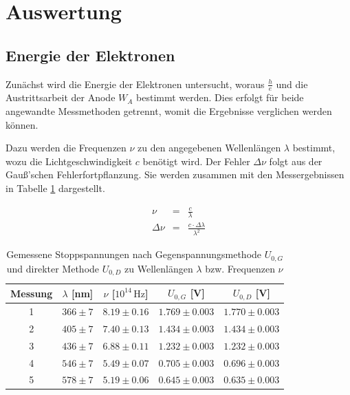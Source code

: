 \documentclass[12pt,a4paper]{scrartcl}
\numberwithin{equation}{section} %
\begin{document}
\clearpage
\hypertarget{auswertung}{\section{Auswertung}\label{auswertung}}
\subsection{Energie der Elektronen}
\label{auswertung:h/e}
Zunächst wird die Energie der Elektronen untersucht, woraus $\frac{h}{e}$ und die Austrittsarbeit der Anode $W_A$ bestimmt werden. Dies erfolgt für beide angewandte Messmethoden getrennt, womit die Ergebnisse verglichen werden können.

Dazu werden die Frequenzen $\nu$ zu den angegebenen Wellenlängen $\lambda$ bestimmt, wozu die Lichtgeschwindigkeit $c$ benötigt wird. Der Fehler $\Delta \nu$ folgt aus der Gauß'schen Fehlerfortpflanzung. Sie werden zusammen mit den Messergebnissen in Tabelle \ref{table:Messwerte Energie} dargestellt.

\begin{eqnarray}
	\nu &=& \frac{c}{\lambda} \label{eq:frequenzWellenlänge} \\
	\Delta \nu &=& \frac{c \cdot \Delta \lambda}{\lambda^2}
\end{eqnarray}

\begin{table}[h!]
	\centering
	\begin{tabular}{c|c|c|c|c}
		Messung & $\lambda$ [nm] & $\nu$ [$10^{14} \mathrm{\, Hz}$] & $U_{0,G}$ [V] & $U_{0,D}$ [V] \\
		\hline
		1 & $366 \pm 7$ & $8.19 \pm 0.16$ & $1.769 \pm 0.003$ & $1.770 \pm 0.003$ \\
		2 & $405 \pm 7$ & $7.40 \pm 0.13$ & $1.434 \pm 0.003$ & $1.434 \pm 0.003$ \\
		3 & $436 \pm 7$ & $6.88 \pm 0.11$ & $1.232 \pm 0.003$ & $1.232 \pm 0.003$ \\
		4 & $546 \pm 7$ & $5.49 \pm 0.07$ & $0.705 \pm 0.003$ & $0.696 \pm 0.003$ \\
		5 & $578 \pm 7$ & $5.19 \pm 0.06$ & $0.645 \pm 0.003$ & $0.635 \pm 0.003$
	\end{tabular}
	\caption{Gemessene Stoppspannungen nach Gegenspannungsmethode $U_{0,G}$ und direkter Methode $U_{0,D}$ zu Wellenlängen $\lambda$ bzw. Frequenzen $\nu$}
	\label{table:Messwerte Energie}
\end{table}
\end{document}
